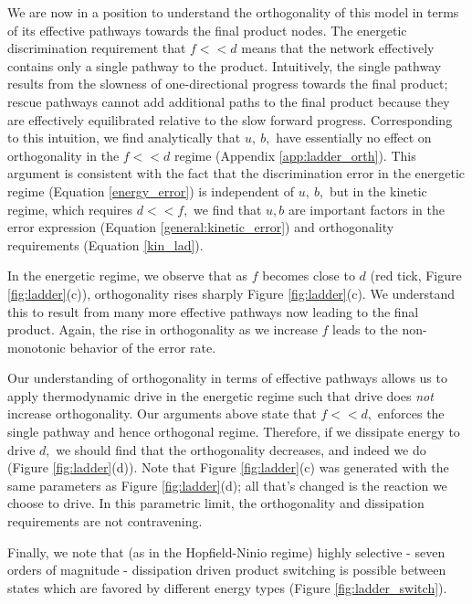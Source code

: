 We are now in a position to understand the orthogonality of this model in terms of its effective pathways towards the final product nodes.  The energetic discrimination requirement that $f<<d$ means that the network effectively contains only a single pathway to the product.  Intuitively, the single pathway results from the slowness of one-directional progress towards the final product; rescue pathways cannot add additional paths to the final product because they are effectively equilibrated relative to the slow forward progress.  Corresponding to this intuition, we find analytically that $u, \ b,$ have essentially no effect on orthogonality in the $f<<d$ regime (Appendix \ref{app:ladder_orth}).  This argument is consistent with the fact that the discrimination error in the energetic regime (Equation \ref{energy_error}) is independent of $u, \ b,$ but in the kinetic regime, which requires $d<<f,$ we find that $u, b$ are important factors in the error expression (Equation \ref{general:kinetic_error}) and orthogonality requirements (Equation \ref{kin_lad}).

In the energetic regime, we observe that as $f$ becomes close to $d$ (red tick, Figure \ref{fig:ladder}(c)), orthogonality rises sharply Figure \ref{fig:ladder}(c).  We understand this to result from many more effective pathways now leading to the final product.  Again, the rise in orthogonality as we increase $f$ leads to the non-monotonic behavior of the error rate.  

Our understanding of orthogonality in terms of effective pathways allows us to apply thermodynamic drive in the energetic regime such that drive does {\it not} increase orthogonality.  Our arguments above state that $f << d,$ enforces the single pathway and hence orthogonal regime.  Therefore, if we dissipate energy to drive $d,$ we should find that the orthogonality decreases, and indeed we do (Figure \ref{fig:ladder}(d)).  Note that Figure \ref{fig:ladder}(c) was generated with the same parameters as Figure \ref{fig:ladder}(d); all that's changed is the reaction we choose to drive.  In this parametric limit, the orthogonality and dissipation requirements are not contravening.  


Finally, we note that (as in the Hopfield-Ninio regime) highly selective  - seven orders of magnitude - dissipation driven product switching is possible between states which are favored by different energy types (Figure \ref{fig:ladder_switch}).



